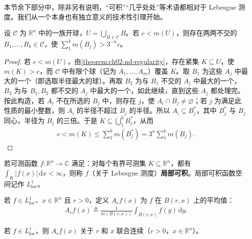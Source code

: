 \documentclass[../../main.tex]{subfiles}%
\begin{document}
本节余下部分中，除非另有说明，“可积”“几乎处处”等术语都相对于 Lebesgue 测度。我们从一个本身也有独立意义的技术性引理开始。
\begin{lemma}\label{lemma:ch03-ball-covering}
设 $\mathscr{C}$ 为 $\mathbb{R}^n$ 中的一族开球，$U=\bigcup_{B\in\mathscr{C}}B$。若 $c<m(U)$，则存在两两不交的 $B_1,\ldots,B_k\in\mathscr{C}$，使 $\sum_1^k m(B_j)>3^{-n}c$。
\end{lemma}
\begin{proof}
若 $c<m(U)$，由\cref{theorem:ch02-nd-regularity}，存在紧集 $K\subseteq U$，使 $m(K)>c$，而 $\mathscr{C}$ 中有限个球（记为 $A_1,\ldots,A_m$）覆盖 $K$。取 $B_1$ 为这些 $A_j$ 中最大的一个（即选取半径最大的球）。再取 $B_2$ 为与 $B_1$ 不交的 $A_j$ 中最大的一个，$B_3$ 为与 $B_1,B_2$ 都不交的 $A_j$ 中最大的一个，如此继续，直到这些 $A_j$ 都处理完。按此构造，若 $A_i$ 不在所选的 $B_j$ 中，则存在 $j$，使 $A_i\cap B_j\ne\varnothing$；若 $j$ 为满足此性质的最小整数，则 $A_i$ 的半径不超过 $B_j$ 的半径。所以 $A_i\subseteq B_j^*$，其中 $B_j^*$ 与 $B_j$ 同心，半径为 $B_j$ 的三倍。于是 $K\subseteq\bigcup_1^kB_j^*$，从而
\begin{align*}
c<m(K)\le\sum_1^k m(B_j^*)=3^n\sum_1^k m(B_j).
\end{align*}
\end{proof}
\begin{definition}[局部可积]\label{definition:ch03-locally-integrable}
若可测函数 $f:\mathbb{R}^n\to\mathbb{C}$ 满足：对每个有界可测集 $K\subseteq\mathbb{R}^n$，都有 $\int_K|f(x)|\,\mathrm{d}x<\infty$，则称 $f$（关于 Lebesgue 测度）\textbf{局部可积}。局部可积函数空间记作 $L^1_{\mathrm{loc}}$。
\end{definition}
\begin{definition}[球上的平均值]\label{definition:ch03-ball-average}
若 $f\in L^1_{\mathrm{loc}}$、$x\in\mathbb{R}^n$ 且 $r>0$，定义 $A_rf(x)$ 为 $f$ 在 $B(r,x)$ 上的平均值：
\begin{align*}
A_rf(x)\triangleq\frac{1}{m(B(r,x))}\int_{B(r,x)}f(y)\,\mathrm{d}y.
\end{align*}
\end{definition}
\begin{lemma}\label{lemma:ch03-ball-average-continuity}
若 $f\in L^1_{\mathrm{loc}}$，则 $A_rf(x)$ 关于 $r$ 和 $x$ 联合连续（$r>0$，$x\in\mathbb{R}^n$）。
\end{lemma}
\end{document}
